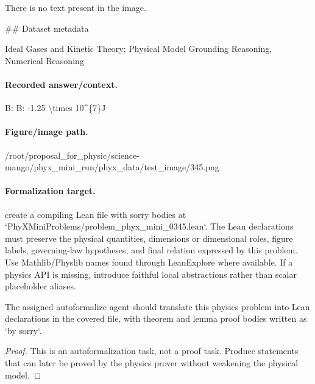 There is no text present in the image.

\#\# Dataset metadata

Ideal Gases and Kinetic Theory; Physical Model Grounding Reasoning, Numerical Reasoning

\paragraph{Recorded answer/context.}
B: B: -1.25 \textbackslash{}times 10\textasciicircum{}\{7\}J

\paragraph{Figure/image path.}
/root/proposal\_for\_physic/science-mango/phyx\_mini\_run/phyx\_data/test\_image/345.png

\paragraph{Formalization target.}
create a compiling Lean file with sorry bodies at `PhyXMiniProblems/problem\_phyx\_mini\_0345.lean`. The Lean declarations must preserve the physical quantities, dimensions or dimensional roles, figure labels, governing-law hypotheses, and final relation expressed by this problem.
Use Mathlib/Physlib names found through LeanExplore where available. If a physics API is missing, introduce faithful local abstractions rather than scalar placeholder aliases.

\begin{theorem}
\label{thm:physics:phyx_mini_0345:target}
The assigned autoformalize agent should translate this physics problem into Lean declarations in the covered file, with theorem and lemma proof bodies written as `by sorry`.
\end{theorem}
\begin{proof}
This is an autoformalization task, not a proof task. Produce statements that can later be proved by the physics prover without weakening the physical model.
\end{proof}

